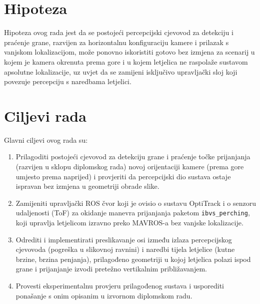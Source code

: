 \section{Hipoteza}
\label{sec:hipoteza}

Hipoteza ovog rada jest da se postojeći percepcijski cjevovod za detekciju i praćenje grane, razvijen za horizontalnu konfiguraciju kamere i prilazak s vanjskom lokalizacijom, može ponovno iskoristiti gotovo bez izmjena za scenarij u kojem je kamera okrenuta prema gore i u kojem letjelica ne raspolaže sustavom apsolutne lokalizacije, uz uvjet da se zamijeni isključivo upravljački sloj koji povezuje percepciju s naredbama letjelici.

\section{Ciljevi rada}
\label{sec:ciljevi}

Glavni ciljevi ovog rada su:

\begin{enumerate}
  \item Prilagoditi postojeći cjevovod za detekciju grane i praćenje točke prijanjanja (razvijen u sklopu diplomskog rada) novoj orijentaciji kamere (prema gore umjesto prema naprijed) i provjeriti da percepcijski dio sustava ostaje ispravan bez izmjena u geometriji obrade slike.
  \item Zamijeniti upravljački ROS čvor koji je ovisio o sustavu OptiTrack i o senzoru udaljenosti (ToF) za okidanje manevra prijanjanja paketom \texttt{ibvs\_perching}, koji upravlja letjelicom izravno preko MAVROS-a bez vanjske lokalizacije.
  \item Odrediti i implementirati preslikavanje osi između izlaza percepcijskog cjevovoda (pogreška u slikovnoj ravnini) i naredbi tijela letjelice (kutne brzine, brzina penjanja), prilagođeno geometriji u kojoj letjelica polazi ispod grane i prijanjanje izvodi pretežno vertikalnim približavanjem.
  \item Provesti eksperimentalnu provjeru prilagođenog sustava i usporediti ponašanje s onim opisanim u izvornom diplomskom radu.
\end{enumerate}
